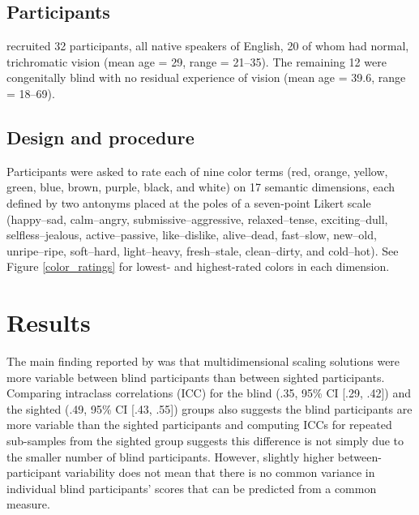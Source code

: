 \documentclass[10pt,letterpaper]{article}
\begin{document}
\subsection{Participants}
\citeauthor{saysani2021seeing} recruited 32 participants, all native speakers of English, 20 of whom had normal, trichromatic vision (mean age = 29, range = 21--35). The remaining 12 were congenitally blind with no residual experience of vision (mean age = 39.6, range = 18--69).
\subsection{Design and procedure}
Participants were asked to rate each of nine color terms (red, orange, yellow, green, blue, brown, purple, black, and white) on 17 semantic dimensions, each defined by two antonyms placed at the poles of a seven-point Likert scale (happy–sad, calm–angry, submissive–aggressive, relaxed–tense, exciting–dull, selfless–jealous, active–passive, like–dislike, alive–dead, fast–slow, new–old, unripe–ripe, soft–hard, light–heavy, fresh–stale, clean–dirty, and cold–hot). See Figure \ref{color_ratings} for lowest- and highest-rated colors in each dimension.
\section{Results}
The main finding reported by  was that multidimensional scaling solutions were more variable between blind participants than between sighted participants. Comparing intraclass correlations (ICC) for the blind (.35, 95\% CI [.29, .42]) and the sighted (.49, 95\% CI [.43, .55]) groups also suggests the blind participants are more variable than the sighted participants and computing ICCs for repeated sub-samples from the sighted group suggests this difference is not simply due to the smaller number of blind participants. However, slightly higher between-participant variability does not mean that there is no common variance in individual blind participants' scores that can be predicted from a common measure.
\end{document}
